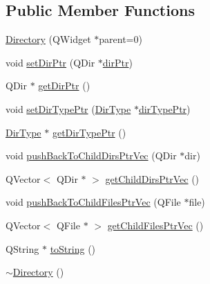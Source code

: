 \subsection*{Public Member Functions}
\begin{DoxyCompactItemize}
\item 
\hyperlink{class_directory_aeecdbc52ed5d2069d57c8e5618a73f1e}{Directory} (Q\-Widget $\ast$parent=0)
\item 
void \hyperlink{class_directory_ad17ee176714d11afae82e7bf20def5a5}{set\-Dir\-Ptr} (Q\-Dir $\ast$\hyperlink{class_directory_ae8d40a5989c8fe90988aa9517cb87a9a}{dir\-Ptr})
\item 
Q\-Dir $\ast$ \hyperlink{class_directory_a1ae52186cc94eee26fc6161b67dd0ba2}{get\-Dir\-Ptr} ()
\item 
void \hyperlink{class_directory_af3cac89c90ab3097e7a7a36be6b12c64}{set\-Dir\-Type\-Ptr} (\hyperlink{class_directory_a1c40bdd8c03ef51a29fa097c325fe345}{Dir\-Type} $\ast$\hyperlink{class_directory_aeb912c1ed24b2bea1febce142fa3a57e}{dir\-Type\-Ptr})
\item 
\hyperlink{class_directory_a1c40bdd8c03ef51a29fa097c325fe345}{Dir\-Type} $\ast$ \hyperlink{class_directory_ae44daf13fc34b0b1e1d4198feec67a94}{get\-Dir\-Type\-Ptr} ()
\item 
void \hyperlink{class_directory_a4ba19180f0e71eb407d93e6b83ea7802}{push\-Back\-To\-Child\-Dirs\-Ptr\-Vec} (Q\-Dir $\ast$dir)
\item 
Q\-Vector$<$ Q\-Dir $\ast$ $>$ \hyperlink{class_directory_ab6f2b6cdc1da5fb168743cdfbece2f87}{get\-Child\-Dirs\-Ptr\-Vec} ()
\item 
void \hyperlink{class_directory_a9d5365aa51a62931af93272d97ea2b85}{push\-Back\-To\-Child\-Files\-Ptr\-Vec} (Q\-File $\ast$file)
\item 
Q\-Vector$<$ Q\-File $\ast$ $>$ \hyperlink{class_directory_a769dcd01a9476d1556384c1572156a04}{get\-Child\-Files\-Ptr\-Vec} ()
\item 
Q\-String $\ast$ \hyperlink{class_directory_a4f0ef25beff4469b7eb06765a0b1fa26}{to\-String} ()
\item 
\hyperlink{class_directory_affbde8714685c61601421097d621341d}{$\sim$\-Directory} ()
\end{DoxyCompactItemize}
